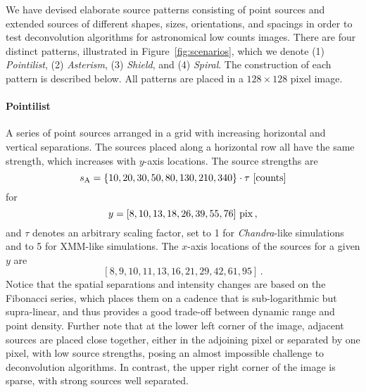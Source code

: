 \documentclass[twocolumn]{aastex631}
\begin{document}
    \label{sec:app:A}

    We have devised elaborate source patterns consisting of point sources and extended sources of different shapes, sizes, orientations, and spacings in order to test deconvolution algorithms for astronomical low counts images.  There are four distinct patterns, illustrated in Figure~\ref{fig:scenarios}, which we denote (1) {\sl Pointilist}, (2) {\sl Asterism}, (3) {\sl Shield}, and (4) {\sl Spiral}.  The construction of each pattern is described below.  All patterns are placed in a $128{\times}128$ pixel image.

    \paragraph{Pointilist} A series of point sources arranged in a grid with increasing horizontal and vertical separations.  The sources placed along a horizontal row all have the same strength, which increases with $y$-axis locations.  The source strengths are 
    $$s_{\rm A} = \{10, 20, 30, 50, 80, 130, 210, 340\} \cdot \tau ~{\rm [counts]} $$
    for
    $$y = [8, 10, 13, 18, 26, 39, 55, 76]~{\rm pix} \,,$$
    and $\tau$ denotes an arbitrary scaling factor, set to 1 for \textit{Chandra}-like simulations and to 5 for XMM-like simulations.
    The $x$-axis locations of the sources for a given $y$ are
    $$[8, 9, 10, 11, 13, 16, 21, 29, 42, 61, 95] \,.$$
    Notice that the spatial separations and intensity changes are based on the Fibonacci series, which places them on a cadence that is sub-logarithmic but supra-linear, and thus provides a good trade-off between dynamic range and point density.  Further note that at the lower left corner of the image, adjacent sources are placed close together, either in the adjoining pixel or separated by one pixel, with low source strengths, posing an almost impossible challenge to deconvolution algorithms.  In contrast, the upper right corner of the image is sparse, with strong sources well separated.
\end{document}
